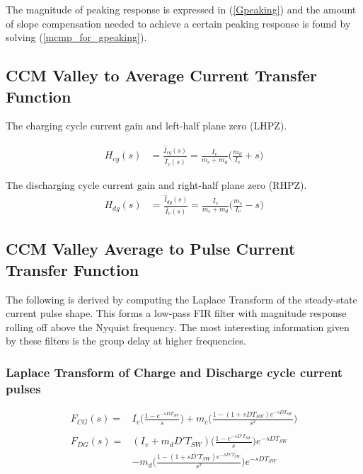 \documentclass{scrartcl}
\begin{document}
		The magnitude of peaking response is expressed in (\ref{Gpeaking}) and the amount of slope compensation needed to achieve a certain peaking response is found by solving (\ref{mcmp_for_gpeaking}).
		
		\subsection{CCM Valley to Average Current Transfer Function}
		The charging cycle current gain and left-half plane zero (LHPZ).

		\begin{align}
		H_{cg} (s) &= \frac{\hat{I}_{cg}(s)}{\hat{I}_{v}(s)} =\frac{I_{v}}{m_c + m_d}
		\big (\frac{m_d}{I_{v}} + s \big )
		\label{LHPZ_s_raw}
		\end{align}
		
		The discharging cycle current gain and right-half plane zero (RHPZ).
		\begin{align}
		H_{dg} (s) &= \frac{\hat{I}_{dg}(s)}{\hat{I}_{v}(s)} =\frac{I_{v}}{m_c + m_d}
		\big (\frac{m_c}{I_{v}} - s \big )
		\label{RHPZ_s_raw}
		\end{align}

		\subsection{CCM Valley Average to Pulse Current Transfer Function}	
		The following is derived by computing the Laplace Transform of the steady-state current pulse shape.  This forms a low-pass FIR filter with magnitude response rolling off above the Nyquist frequency.  The most interesting information given by these filters is the group delay at higher frequencies.
		
		\subsubsection{Laplace Transform of Charge and Discharge cycle current pulses}	
		
		\begin{align}
		F_{CG}(s) =&   I_{v} \bigg( \frac{1 - e^{-sDT_{SW}}}{s} \bigg)
		+ m_c\bigg( \frac{1 - (1 + sDT_{SW})e^{-sDT_{SW}}}{s^2} \bigg)
		\label{icg_IR_laplace} \\
		\nonumber\\
		F_{DG}(s) =& (I_{v} +m_d D'T_{SW}) \bigg( \frac{1 - e^{-sD'T_{SW}}}{s} \bigg)  e^{-sDT_{SW}}\nonumber\\
		&- m_d \bigg( \frac{1 - (1 + sD'T_{SW})e^{-sD'T_{SW}}}{s^2} \bigg)  e^{-sDT_{SW}}
		\label{idg_IR_laplace}
		\end{align}
		
\end{document}
